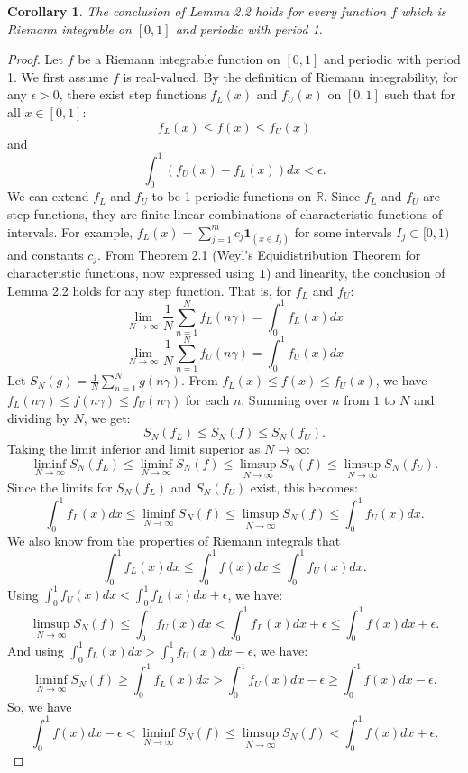 \documentclass[12pt]{article}
\newtheorem{corollary}[theorem]{Corollary}
\newcommand{\R}{\mathbb{R}}
\begin{document}
\begin{corollary}
The conclusion of Lemma 2.2 holds for every function $f$ which is Riemann integrable on $[0,1]$ and periodic with period 1.
\end{corollary}
\begin{proof}
Let $f$ be a Riemann integrable function on $[0,1]$ and periodic with period 1. We first assume $f$ is real-valued.
By the definition of Riemann integrability, for any $\epsilon > 0$, there exist step functions $f_L(x)$ and $f_U(x)$ on $[0,1]$ such that for all $x \in [0,1]$:
$$ f_L(x) \le f(x) \le f_U(x) $$
and
$$ \int_0^1 (f_U(x) - f_L(x)) dx < \epsilon. $$
We can extend $f_L$ and $f_U$ to be 1-periodic functions on $\R$.
Since $f_L$ and $f_U$ are step functions, they are finite linear combinations of characteristic functions of intervals. For example, $f_L(x) = \sum_{j=1}^m c_j \mathbf{1}_{(x \in I_j)}$ for some intervals $I_j \subset [0,1)$ and constants $c_j$.
From Theorem 2.1 (Weyl's Equidistribution Theorem for characteristic functions, now expressed using $\mathbf{1}$) and linearity, the conclusion of Lemma 2.2 holds for any step function. That is, for $f_L$ and $f_U$:
$$ \lim_{N\to\infty} \frac{1}{N} \sum_{n=1}^N f_L(n\gamma) = \int_0^1 f_L(x) dx $$
$$ \lim_{N\to\infty} \frac{1}{N} \sum_{n=1}^N f_U(n\gamma) = \int_0^1 f_U(x) dx $$
Let $S_N(g) = \frac{1}{N} \sum_{n=1}^N g(n\gamma)$.
From $f_L(x) \le f(x) \le f_U(x)$, we have $f_L(n\gamma) \le f(n\gamma) \le f_U(n\gamma)$ for each $n$.
Summing over $n$ from $1$ to $N$ and dividing by $N$, we get:
$$ S_N(f_L) \le S_N(f) \le S_N(f_U). $$
Taking the limit inferior and limit superior as $N \to \infty$:
$$ \liminf_{N\to\infty} S_N(f_L) \le \liminf_{N\to\infty} S_N(f) \le \limsup_{N\to\infty} S_N(f) \le \limsup_{N\to\infty} S_N(f_U). $$
Since the limits for $S_N(f_L)$ and $S_N(f_U)$ exist, this becomes:
$$ \int_0^1 f_L(x) dx \le \liminf_{N\to\infty} S_N(f) \le \limsup_{N\to\infty} S_N(f) \le \int_0^1 f_U(x) dx. $$
We also know from the properties of Riemann integrals that
$$ \int_0^1 f_L(x) dx \le \int_0^1 f(x) dx \le \int_0^1 f_U(x) dx. $$
Using $\int_0^1 f_U(x) dx < \int_0^1 f_L(x) dx + \epsilon$, we have:
$$ \limsup_{N\to\infty} S_N(f) \le \int_0^1 f_U(x) dx < \int_0^1 f_L(x) dx + \epsilon \le \int_0^1 f(x) dx + \epsilon. $$
And using $\int_0^1 f_L(x) dx > \int_0^1 f_U(x) dx - \epsilon$, we have:
$$ \liminf_{N\to\infty} S_N(f) \ge \int_0^1 f_L(x) dx > \int_0^1 f_U(x) dx - \epsilon \ge \int_0^1 f(x) dx - \epsilon. $$
So, we have
$$ \int_0^1 f(x) dx - \epsilon < \liminf_{N\to\infty} S_N(f) \le \limsup_{N\to\infty} S_N(f) < \int_0^1 f(x) dx + \epsilon. $$

\end{proof}
\end{document}
